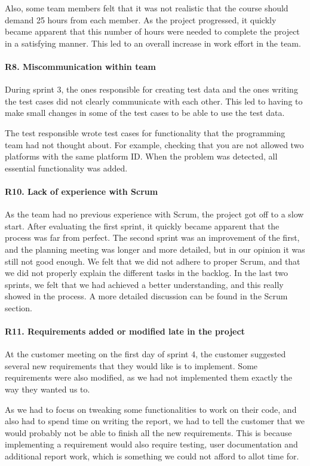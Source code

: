 Also, some team members felt that it was not realistic that the course should demand 25 hours from each member. As the project progressed, it quickly became apparent that this number of hours were needed to complete the project in a satisfying manner. This led to an overall increase in work effort in the team.

\paragraph{R8. Miscommunication within team}
During sprint 3, the ones responsible for creating test data and the ones writing the test cases did not clearly communicate with each other. This led to having to make small changes in some of the test cases to be able to use the test data.

The test responsible wrote test cases for functionality that the programming team had not thought about. For example, checking that you are not allowed two platforms with the same platform ID.
When the problem was detected, all essential functionality was added.

\paragraph{R10. Lack of experience with Scrum}
As the team had no previous experience with Scrum, the project got off to a slow start.
After evaluating the first sprint, it quickly became apparent that the process was far from perfect.
The second sprint was an improvement of the first, and the planning meeting was longer and more detailed, but in our opinion it was still not good enough. We felt that we did not adhere to proper Scrum, and that we did not properly explain the different tasks in the backlog. In the last two sprints, we felt that we had achieved a better understanding, and this really showed in the process. A more detailed discussion can be found in the Scrum section.

\paragraph{R11. Requirements added or modified late in the project}
At the customer meeting on the first day of sprint 4, the customer suggested several new requirements that they would like is to implement. Some requirements were also modified, as we had not implemented them exactly the way they wanted us to.

As we had to focus on tweaking some functionalities to work on their code, and also had to spend time on writing the report, we had to tell the customer that we would probably not be able to finish all the new requirements. This is because implementing a requirement would also require testing, user documentation and additional report work, which is something we could not afford to allot time for.


